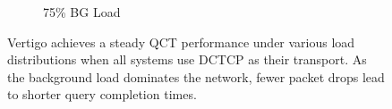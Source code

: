 \begin{figure}[th!]
\begin{subfigure}[t]{.32\linewidth}
		\caption{\small{75\% BG Load}}
		\label{fig:qps75}
	\end{subfigure}
	\caption{\small{Vertigo achieves a steady QCT performance under various load distributions when all systems use DCTCP as their transport. As the background load dominates the network, fewer packet drops lead to shorter query completion times.}}
	\label{fig:qps}
\end{figure}

